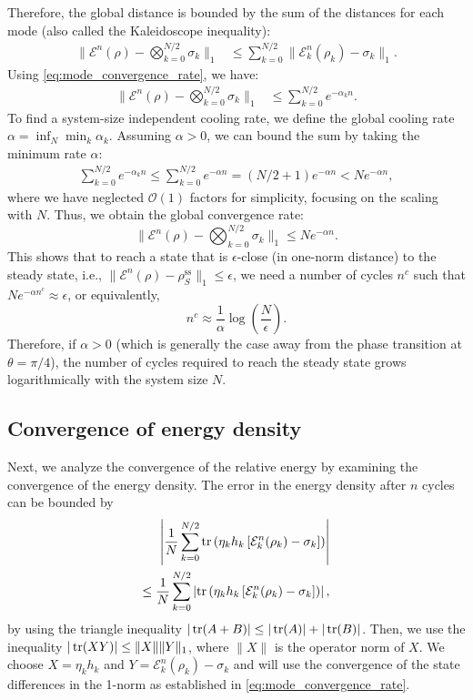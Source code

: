 Therefore, the global distance is bounded by the sum of the distances for each mode (also called the Kaleidoscope inequality):
\begin{align}
    \|\mathcal{E}^n(\rho)-\bigotimes_{k=0}^{N/2}\sigma_k\|_1 &\leq \sum_{k=0}^{N/2} \|\mathcal{E}_k^n(\rho_k)-\sigma_k\|_1.
\end{align}
Using \cref{eq:mode_convergence_rate}, we have:
\begin{align}
    \|\mathcal{E}^n(\rho) - \bigotimes_{k=0}^{N/2}\sigma_k\|_1 &\leq \sum_{k=0}^{N/2} e^{-\alpha_k n}.
\end{align}
To find a system-size independent cooling rate, we define the global cooling rate $ \alpha = \inf_N \min_k \alpha_k$. Assuming $\alpha > 0$, we can bound the sum by taking the minimum rate $\alpha$:
\begin{align}
    \sum_{k=0}^{N/2} e^{-\alpha_k n} \le \sum_{k=0}^{N/2} e^{-\alpha n} = (N/2 + 1) e^{-\alpha n} < N e^{-\alpha n},
\end{align}
where we have neglected $\mathcal{O}(1)$ factors for simplicity, focusing on the scaling with $N$. Thus, we obtain the global convergence rate:
\begin{equation}
    \|\mathcal{E}^n(\rho)-\bigotimes_{k=0}^{N/2}\sigma_k\|_1 \leq N e^{-\alpha n}.
\end{equation}
This shows that to reach a state that is $\epsilon$-close (in one-norm distance) to the steady state, i.e., $\|\mathcal{E}^n(\rho)-\rho_{S}^\text{ss}\|_1 \le \epsilon$, we need a number of cycles $n^c$ such that $N e^{-\alpha n^c} \approx \epsilon$, or equivalently,
\begin{equation}
    n^c \approx \frac{1}{\alpha} \log\left(\frac{N}{\epsilon}\right).
\end{equation}
Therefore, if $\alpha > 0$ (which is generally the case away from the phase transition at $\theta = \pi/4$), the number of cycles required to reach the steady state grows logarithmically with the system size $N$.

\subsection{Convergence of energy density}
\label{subsec:energy_convergence}

Next, we analyze the convergence of the relative energy by examining the convergence of the energy density. The error in the energy density after $n$ cycles can be bounded by
\begin{align}
    \left|\frac{1}{N}\sum_{k=0}^{N/2} \operatorname{tr}\left(\eta_k h_k \left[\mathcal{E}_k^n(\rho_k)- \sigma_k\right]\right)\right|\nonumber\\
    \le \frac{1}{N}\sum_{k=0}^{N/2} \left|\operatorname{tr}\left(\eta_k h_k \left[\mathcal{E}_k^n(\rho_k)- \sigma_k\right]\right)\right|,
\end{align}
by using the triangle inequality $|\operatorname{tr}(A+B)| \le |\operatorname{tr}(A)| + |\operatorname{tr}(B)|$.
Then, we use the inequality $|\operatorname{tr}(XY)| \le \|X\| \|Y\|_1$, where $\|X\|$ is the operator norm of $X$. We choose $X = \eta_k h_k$ and $Y = \mathcal{E}_k^n(\rho_k)- \sigma_k$ and will use the convergence of the state differences in the 1-norm as established in \cref{eq:mode_convergence_rate}.


